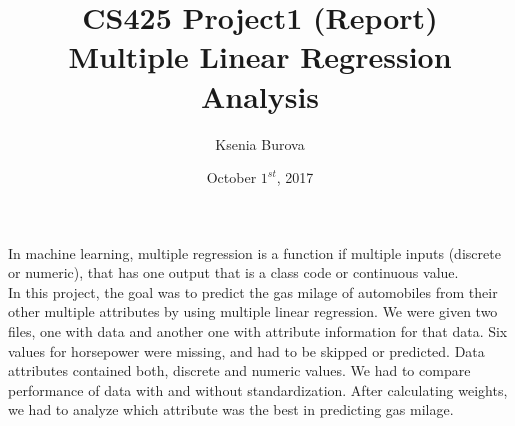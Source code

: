 \documentclass[12pt, letterpaper]{article}
\title{CS425 Project1 (Report)\\Multiple Linear Regression Analysis}
\author{Ksenia Burova}
\date{October \(1^{st}\), 2017}
\begin{document}
\maketitle

 In machine learning, multiple regression is a function if multiple inputs (discrete or numeric), that has one output that is a class code or continuous value. \\
In this project, the goal was to predict the gas milage of automobiles from their other multiple attributes by using multiple linear regression. We were given two files, one with data and another one with attribute information for that data. Six values for horsepower were missing, and had to be skipped or predicted. Data attributes contained both, discrete and numeric values. We had to compare performance of data with and without standardization. After calculating weights, we had to analyze which attribute was the best in predicting gas milage. 
\end{document}
